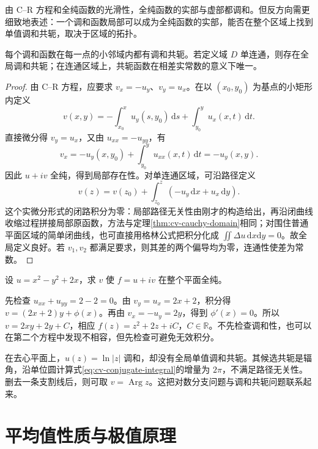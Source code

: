 \documentclass[UTF8,12pt,a4paper,fontset=fandol]{ctexbook}
\begin{document}
由 C--R 方程和全纯函数的光滑性，全纯函数的实部与虚部都调和。但反方向需更细致地表述：一个调和函数局部可以成为全纯函数的实部，能否在整个区域上找到单值调和共轭，取决于区域的拓扑。

\begin{theorem}[调和共轭的存在]
\label{thm:cv-conjugate}
每个调和函数在每一点的小邻域内都有调和共轭。若定义域 $D$ 单连通，则存在全局调和共轭；在连通区域上，共轭函数在相差实常数的意义下唯一。
\end{theorem}
\begin{proof}
由 C--R 方程，应要求 $v_x=-u_y$、$v_y=u_x$。在以 $(x_0,y_0)$ 为基点的小矩形内定义
\[
 v(x,y)=-\int_{x_0}^{x}u_y(s,y_0)\,\mathrm ds
 +\int_{y_0}^{y}u_x(x,t)\,\mathrm dt.
\]
直接微分得 $v_y=u_x$，又由 $u_{xx}=-u_{yy}$，有
\[
 v_x=-u_y(x,y_0)+\int_{y_0}^{y}u_{xx}(x,t)\,\mathrm dt
 =-u_y(x,y).
\]
因此 $u+iv$ 全纯，得到局部存在性。对单连通区域，可沿路径定义
\begin{equation}
 v(z)=v(z_0)+\int_{z_0}^{z}(-u_y\,\mathrm dx+u_x\,\mathrm dy).
 \label{eq:cv-conjugate-integral}
\end{equation}
这个实微分形式的闭路积分为零：局部路径无关性由刚才的构造给出，再沿闭曲线收缩过程拼接局部原函数，方法与定理\ref{thm:cv-cauchy-domain}相同；对围住普通平面区域的简单闭曲线，也可直接用格林公式把积分化成 $\iint\Delta u\,\mathrm dx\mathrm dy=0$。故全局定义良好。若 $v_1,v_2$ 都满足要求，则其差的两个偏导均为零，连通性使差为常数。
\end{proof}

\begin{example}[实际求调和共轭]
设 $u=x^2-y^2+2x$，求 $v$ 使 $f=u+iv$ 在整个平面全纯。
\end{example}
\begin{solve}
先检查 $u_{xx}+u_{yy}=2-2=0$。由 $v_y=u_x=2x+2$，积分得 $v=(2x+2)y+\phi(x)$。再由 $v_x=-u_y=2y$，得到 $\phi'(x)=0$。所以 $v=2xy+2y+C$，相应 $f(z)=z^2+2z+iC$，$C\in\mathbb R$。不先检查调和性，也可以在第二个方程中发现不相容，但先检查可避免无效积分。
\end{solve}

在去心平面上，$u(z)=\ln|z|$ 调和，却没有全局单值调和共轭。其候选共轭是辐角，沿单位圆计算式\eqref{eq:cv-conjugate-integral}的增量为 $2\pi$，不满足路径无关性。删去一条支割线后，则可取 $v=\operatorname{Arg}z$。这把对数分支问题与调和共轭问题联系起来。

\section{平均值性质与极值原理}
\end{document}
